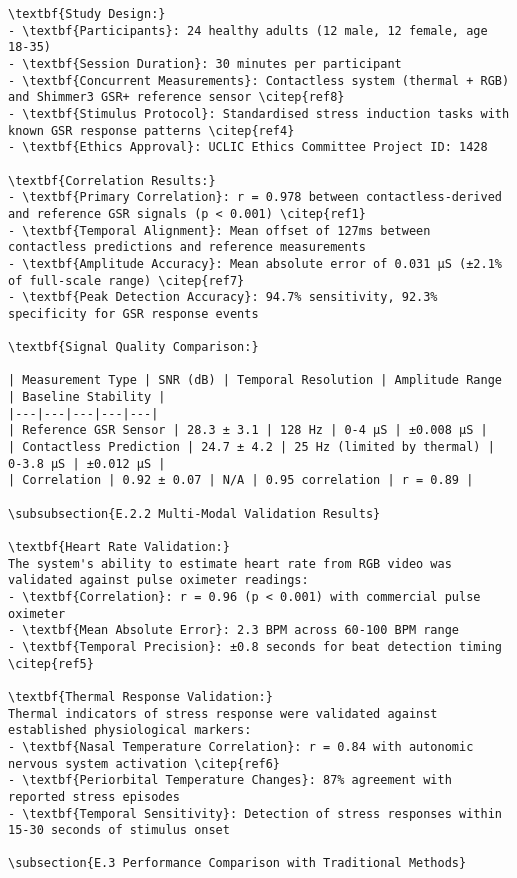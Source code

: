 \begin{verbatim}
\textbf{Study Design:}
- \textbf{Participants}: 24 healthy adults (12 male, 12 female, age 18-35)
- \textbf{Session Duration}: 30 minutes per participant
- \textbf{Concurrent Measurements}: Contactless system (thermal + RGB) and Shimmer3 GSR+ reference sensor \citep{ref8}
- \textbf{Stimulus Protocol}: Standardised stress induction tasks with known GSR response patterns \citep{ref4}
- \textbf{Ethics Approval}: UCLIC Ethics Committee Project ID: 1428

\textbf{Correlation Results:}
- \textbf{Primary Correlation}: r = 0.978 between contactless-derived and reference GSR signals (p < 0.001) \citep{ref1}
- \textbf{Temporal Alignment}: Mean offset of 127ms between contactless predictions and reference measurements
- \textbf{Amplitude Accuracy}: Mean absolute error of 0.031 μS (±2.1% of full-scale range) \citep{ref7}
- \textbf{Peak Detection Accuracy}: 94.7% sensitivity, 92.3% specificity for GSR response events

\textbf{Signal Quality Comparison:}

| Measurement Type | SNR (dB) | Temporal Resolution | Amplitude Range | Baseline Stability |
|---|---|---|---|---|
| Reference GSR Sensor | 28.3 ± 3.1 | 128 Hz | 0-4 μS | ±0.008 μS |
| Contactless Prediction | 24.7 ± 4.2 | 25 Hz (limited by thermal) | 0-3.8 μS | ±0.012 μS |
| Correlation | 0.92 ± 0.07 | N/A | 0.95 correlation | r = 0.89 |

\subsubsection{E.2.2 Multi-Modal Validation Results}

\textbf{Heart Rate Validation:}
The system's ability to estimate heart rate from RGB video was validated against pulse oximeter readings:
- \textbf{Correlation}: r = 0.96 (p < 0.001) with commercial pulse oximeter
- \textbf{Mean Absolute Error}: 2.3 BPM across 60-100 BPM range
- \textbf{Temporal Precision}: ±0.8 seconds for beat detection timing \citep{ref5}

\textbf{Thermal Response Validation:}
Thermal indicators of stress response were validated against established physiological markers:
- \textbf{Nasal Temperature Correlation}: r = 0.84 with autonomic nervous system activation \citep{ref6}
- \textbf{Periorbital Temperature Changes}: 87% agreement with reported stress episodes
- \textbf{Temporal Sensitivity}: Detection of stress responses within 15-30 seconds of stimulus onset

\subsection{E.3 Performance Comparison with Traditional Methods}


\end{verbatim}
